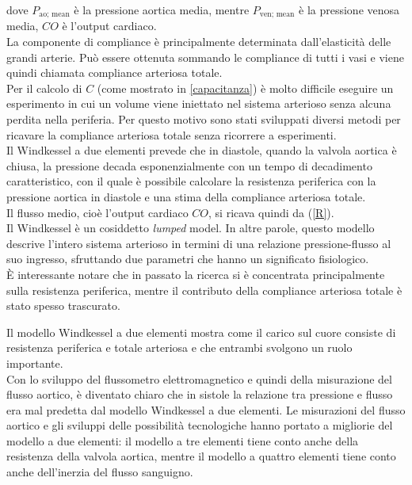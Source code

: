 dove $P_{\text{ao; mean}}$ è la pressione aortica media, mentre $P_{\text{ven; mean}}$ è la pressione venosa media, $CO$ è l'output cardiaco.\\
La componente di compliance è principalmente
determinata dall'elasticità delle grandi
arterie. Può essere ottenuta sommando le compliance
di tutti i vasi e viene quindi chiamata compliance arteriosa totale.\\
Per il calcolo di $C$ (come mostrato in \ref{capacitanza}) è molto difficile eseguire un esperimento in cui un volume viene iniettato nel sistema arterioso senza alcuna perdita nella periferia. Per questo motivo sono stati sviluppati diversi metodi per ricavare la compliance arteriosa totale senza ricorrere a esperimenti.\\
Il Windkessel a due elementi prevede che in diastole,
quando la valvola aortica è chiusa, la pressione decada
esponenzialmente con un tempo di decadimento caratteristico, con il quale è possibile calcolare la resistenza periferica con la pressione aortica in diastole e una stima della compliance arteriosa totale.\\
Il flusso medio, cioè l'output cardiaco $CO$, si ricava quindi da (\ref{R}). \\
Il Windkessel è un cosiddetto \textit{lumped} model. In altre parole, questo modello descrive l'intero sistema arterioso
in termini di una relazione pressione-flusso al suo ingresso,
sfruttando due parametri che hanno un significato fisiologico.\\
È interessante notare che in passato la ricerca si è concentrata principalmente sulla resistenza periferica, mentre il contributo della compliance arteriosa totale è stato spesso trascurato. 


Il modello Windkessel a due elementi mostra come il carico sul cuore consiste di resistenza periferica e totale arteriosa e che entrambi svolgono un ruolo importante.\\

Con lo sviluppo del flussometro elettromagnetico e quindi della misurazione del flusso aortico, è diventato chiaro che in sistole la relazione tra pressione e flusso era mal predetta dal modello Windkessel a due elementi. Le misurazioni del flusso aortico e gli sviluppi delle possibilità tecnologiche hanno portato a migliorie del modello a due elementi: il modello a tre elementi tiene conto anche della resistenza della valvola aortica, mentre il modello a quattro elementi tiene conto anche dell'inerzia del flusso sanguigno.\\

